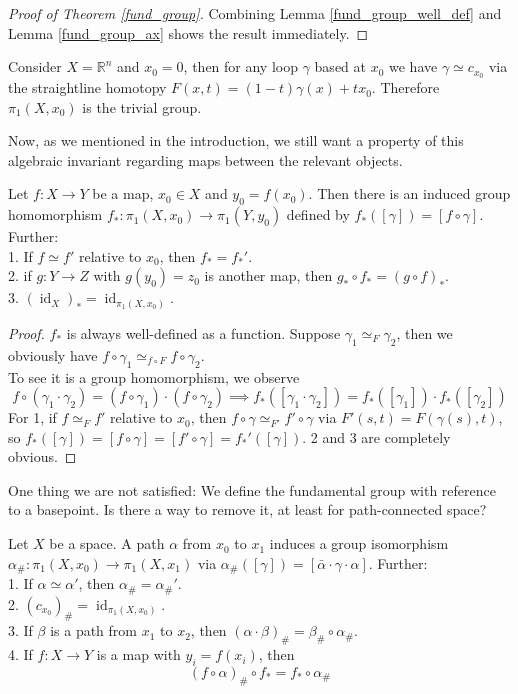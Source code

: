 \begin{proof}[Proof of Theorem \ref{fund_group}]
    Combining Lemma \ref{fund_group_well_def} and Lemma \ref{fund_group_ax} shows the result immediately.
\end{proof}
\begin{example}
    Consider $X=\mathbb R^n$ and $x_0=0$, then for any loop $\gamma$ based at $x_0$ we have $\gamma\simeq c_{x_0}$ via the straightline homotopy $F(x,t)=(1-t)\gamma(x)+tx_0$.
    Therefore $\pi_1(X,x_0)$ is the trivial group.
\end{example}
Now, as we mentioned in the introduction, we still want a property of this algebraic invariant regarding maps between the relevant objects.
\begin{lemma}
    Let $f:X\to Y$ be a map, $x_0\in X$ and $y_0=f(x_0)$.
    Then there is an induced group homomorphism $f_\ast:\pi_1(X,x_0)\to\pi_1(Y,y_0)$ defined by $f_\ast([\gamma])=[f\circ \gamma]$.
    Further:\\
    1. If $f\simeq f'$ relative to $x_0$, then $f_\ast=f_\ast'$.\\
    2. if $g:Y\to Z$ with $g(y_0)=z_0$ is another map, then $g_\ast\circ f_\ast=(g\circ f)_\ast$.\\
    3. $(\operatorname{id}_X)_\ast=\operatorname{id}_{\pi_1(X,x_0)}$.
\end{lemma}
\begin{proof}
    $f_\ast$ is always well-defined as a function.
    Suppose $\gamma_1\simeq_F\gamma_2$, then we obviously have $f\circ \gamma_1\simeq_{f\circ F}f\circ \gamma_2$.\\
    To see it is a group homomorphism, we observe
    $$f\circ(\gamma_1\cdot\gamma_2)=(f\circ \gamma_1)\cdot(f\circ\gamma_2)\implies f_\ast([\gamma_1\cdot\gamma_2])=f_\ast([\gamma_1])\cdot f_\ast([\gamma_2])$$
    For 1, if $f\simeq_F f'$ relative to $x_0$, then $f\circ\gamma\simeq_{F'} f'\circ\gamma$ via $F'(s,t)=F(\gamma(s),t)$, so $f_\ast([\gamma])=[f\circ\gamma]=[f'\circ\gamma]=f_\ast'([\gamma])$.
    2 and 3 are completely obvious.
\end{proof}
One thing we are not satisfied:
We define the fundamental group with reference to a basepoint.
Is there a way to remove it, at least for path-connected space?
\begin{lemma}\label{indep_basepoint}
    Let $X$ be a space.
    A path $\alpha$ from $x_0$ to $x_1$ induces a group isomorphism $\alpha_\#:\pi_1(X,x_0)\to\pi_1(X,x_1)$ via $\alpha_\#([\gamma])=[\bar\alpha\cdot\gamma\cdot\alpha]$.
    Further:\\
    1. If $\alpha\simeq\alpha'$, then $\alpha_\#=\alpha_\#'$.\\
    2. $(c_{x_0})_\#=\operatorname{id}_{\pi_1(X,x_0)}$.\\
    3. If $\beta$ is a path from $x_1$ to $x_2$, then $(\alpha\cdot\beta)_\#=\beta_\#\circ\alpha_\#$.\\
    4. If $f:X\to Y$ is a map with $y_i=f(x_i)$, then
    $$(f\circ\alpha)_\#\circ f_\ast=f_\ast\circ\alpha_\#$$
\end{lemma}

